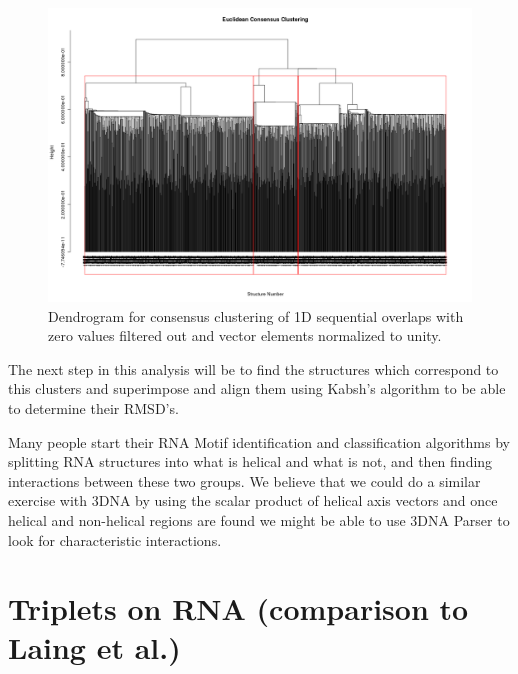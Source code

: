 \begin{figure}[htbp]
\centering 
\includegraphics[angle=90, scale=0.6]{Chapter5/eucli_cons.png}
\caption{Dendrogram for consensus clustering of 1D sequential overlaps
  with zero values filtered out and vector elements normalized to unity.}
\end{figure}
The next step in this analysis will be to find the structures which
correspond to this clusters and superimpose and align them using
Kabsh's algorithm to be able to determine their RMSD's.

Many people start their RNA Motif identification and classification
algorithms by splitting RNA structures into what is helical and what
is not, and then finding interactions between these two groups. We
believe that we could do a similar exercise with 3DNA by using the scalar
product of helical axis vectors and once helical and non-helical
regions are found we might be able to use 3DNA Parser to look for characteristic
interactions.

\section{Triplets on RNA (comparison to Laing et al.)}




